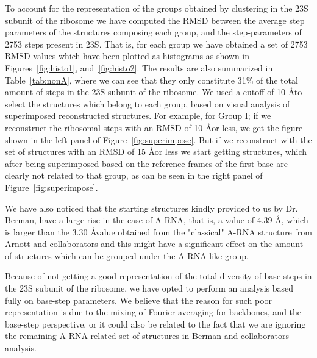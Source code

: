 To account for the representation of the groups obtained by clustering
in the 23S  subunit of the ribosome we have  computed the RMSD between
the average  step parameters of  the structures composing  each group,
and the  step-parameters of 2753 steps  present in 23S.   That is, for
each group we have obtained a  set of 2753 RMSD values which have been
plotted   as   histograms   as  shown   in   Figures~\ref{fig:histo1},
and~\ref{fig:histo2}.    The   results    are   also   summarized   in
Table~\ref{tab:nonA}, where we can  see that they only constitute 31\%
of the  total amount of steps in  the 23S subunit of  the ribosome. We
used a cutoff of 10 \AA  to select the structures which belong to each
group,  based   on  visual  analysis   of  superimposed  reconstructed
structures. For example, for Group  I; if we reconstruct the ribosomal
steps with an RMSD  of 10 \AA or less, we get  the figure shown in the
left panel of Figure~\ref{fig:superimpose}. But if we reconstruct with
the set of structures with an RMSD  of 15 \AA or less we start getting
structures,  which after  being  superimposed based  on the  reference
frames of the first base are clearly not related to that group, as can
be seen in the right panel of Figure~\ref{fig:superimpose}.

We have also  noticed that the starting structures  kindly provided to
us by Dr. Berman,  have a large rise in the case  of A-RNA, that is, a
value of  4.39 \AA, which is  larger than the 3.30  \AA value obtained
from  the "classical"  A-RNA structure  from Arnott  and collaborators
\cite{arnott1973}  and this  might have  a significant  effect  on the
amount of structures which can be grouped under the A-RNA like group.

Because of not getting a good representation of the total diversity of
base-steps  in the  23S  subunit of  the  ribosome, we  have opted  to
perform an  analysis based fully  on base-step parameters.  We believe
that the reason  for such poor representation is due  to the mixing of
Fourier averaging for backbones, and  the base-step perspective, or it
could also be  related to the fact that we  are ignoring the remaining
A-RNA related set of structures in Berman and collaborators analysis.


